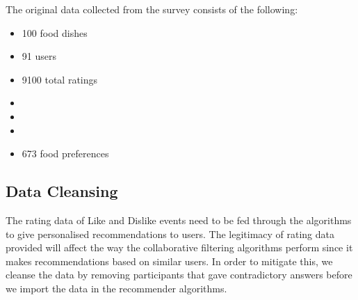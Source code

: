The original data collected from the survey consists of the following:
\begin{itemize}
	\item{100 food dishes}
	\item{91 users}
	\item{9100 total ratings}
	\item{} 
	\item{}
	\item{}
	\item{673 food preferences}
\end{itemize}

% 


\subsection{Data Cleansing}

The rating data of Like and Dislike events need to be fed through the algorithms to give personalised recommendations to users. The legitimacy of rating data provided will affect the way the collaborative filtering algorithms perform since it makes recommendations based on similar users. In order to mitigate this, we cleanse the data by removing participants that gave contradictory answers before we import the data in the recommender algorithms.

